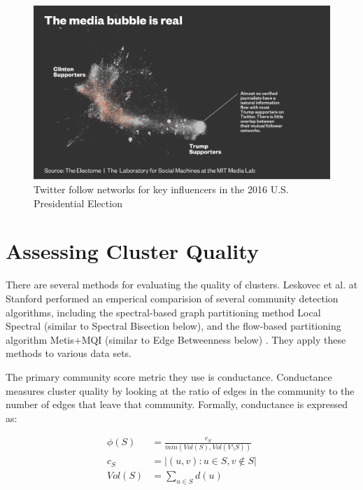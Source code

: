 \documentclass{article}
\begin{document}
\begin{figure}[h]
    \includegraphics[width=\linewidth]{./images/election.png}
    \caption{Twitter follow networks for key influencers in the 2016 U.S. Presidential Election}
    \label{election}
\end{figure}

\section{Assessing Cluster Quality}
There are several methods for evaluating the quality of clusters. Leskovec et al. at Stanford performed an emperical comparision of several community detection algorithms, including the spectral-based graph partitioning method Local Spectral (similar to Spectral Bisection below), and the flow-based partitioning algorithm Metis+MQI (similar to Edge Betweenness below) \cite{Leskovec:2010:ECA:1772690.1772755}. They apply these methods to various data sets.
\par
The primary community score metric they use is conductance. Conductance measures cluster quality by looking at the ratio of edges in the community to the number of edges that leave that community. Formally, conductance is expressed as:

\begin{align}
    \phi(S) &= \frac{c_S}{min(Vol(S), Vol(V \setminus S))} \\
    c_S &= |{(u, v) : u \in S, v \notin S}| \\
    Vol(S) &= \sum_{u \in S}d(u)
\end{align}
\end{document}
